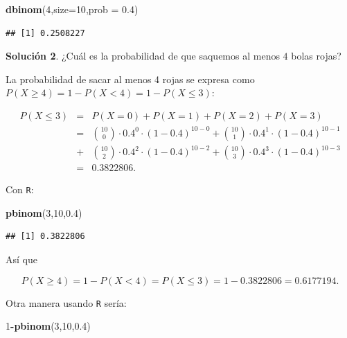 \documentclass[]{book}
\newenvironment{Shaded}{\begin{snugshade}}{\end{snugshade}}
\newcommand{\DataTypeTok}[1]{\textcolor[rgb]{0.13,0.29,0.53}{#1}}
\newcommand{\DecValTok}[1]{\textcolor[rgb]{0.00,0.00,0.81}{#1}}
\newcommand{\FloatTok}[1]{\textcolor[rgb]{0.00,0.00,0.81}{#1}}
\newcommand{\KeywordTok}[1]{\textcolor[rgb]{0.13,0.29,0.53}{\textbf{#1}}}
\newcommand{\NormalTok}[1]{#1}
\newcommand{\OperatorTok}[1]{\textcolor[rgb]{0.81,0.36,0.00}{\textbf{#1}}}
\begin{document}
\begin{Shaded}
\begin{Highlighting}[]
\KeywordTok{dbinom}\NormalTok{(}\DecValTok{4}\NormalTok{,}\DataTypeTok{size=}\DecValTok{10}\NormalTok{,}\DataTypeTok{prob =} \FloatTok{0.4}\NormalTok{)}
\end{Highlighting}
\end{Shaded}

\begin{verbatim}
## [1] 0.2508227
\end{verbatim}

\textbf{Solución 2}. ¿Cuál es la probabilidad de que saquemos al menos \(4\) bolas rojas?

La probabilidad de sacar al menos 4 rojas se expresa como \(P(X \geq 4)=1-P(X<4)=1-P(X\leq 3):\)

\begin{eqnarray*}
P(X\leq 3)&=& P(X=0)+P(X=1)+P(X=2)+P(X=3)\\
&=& 
 {10\choose 0}\cdot 0.4^0\cdot (1-0.4)^{10-0}+ {10\choose 1}\cdot 0.4^1\cdot (1-0.4)^{10-1}\\
&+&{10\choose 2}\cdot 0.4^2\cdot (1-0.4)^{10-2}+ {10\choose 3}\cdot 0.4^3\cdot (1-0.4)^{10-3}\\
&=&0.3822806.
\end{eqnarray*}

Con \texttt{R}:

\begin{Shaded}
\begin{Highlighting}[]
\KeywordTok{pbinom}\NormalTok{(}\DecValTok{3}\NormalTok{,}\DecValTok{10}\NormalTok{,}\FloatTok{0.4}\NormalTok{)}
\end{Highlighting}
\end{Shaded}

\begin{verbatim}
## [1] 0.3822806
\end{verbatim}

Así que

\[P(X \geq 4 )=1-P(X< 4)=P(X\leq 3)=1-0.3822806=0.6177194.\]

Otra manera usando \texttt{R} sería:

\begin{Shaded}
\begin{Highlighting}[]
\DecValTok{1}\OperatorTok{-}\KeywordTok{pbinom}\NormalTok{(}\DecValTok{3}\NormalTok{,}\DecValTok{10}\NormalTok{,}\FloatTok{0.4}\NormalTok{)}
\end{Highlighting}
\end{Shaded}
\end{document}
